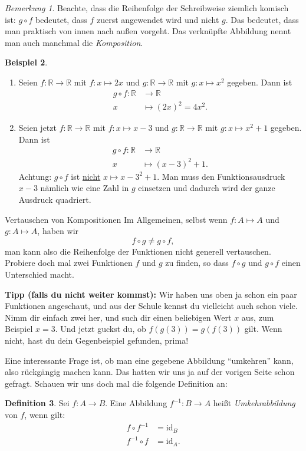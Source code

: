 \documentclass[a4paper,ngerman,12pt]{zirkelblatt1415}
\theoremstyle{definition}
\newtheorem{definition}{Definition}
\newtheorem{beispiel}[definition]{Beispiel}
\theoremstyle{remark}
\newtheorem{bem}[definition]{Bemerkung}
\newcommand{\RR}{\mathbb{R}}
\newcommand{\lra}{\longrightarrow}
\begin{document}
\begin{bem}
  Beachte, dass die Reihenfolge der Schreibweise ziemlich komisch ist: $g\circ f$ bedeutet, dass $f$ zuerst angewendet wird und nicht $g$. 
  Das bedeutet, dass man praktisch von innen nach außen vorgeht. 
  Das verknüpfte Abbildung nennt man auch manchmal die \emph{Komposition}.
\end{bem}

\begin{beispiel}
  \begin{enumerate}
    \item 
    Seien $f:\RR\longrightarrow\RR$ mit $f:x\mapsto 2x$ und $g:\RR\longrightarrow\RR$ mit $g:x \mapsto x^2$ gegeben. Dann ist
      \begin{align*}
        g\circ f:\RR & \longrightarrow \RR \\ 
        x & \longmapsto (2x)^2 = 4x^2.
      \end{align*}
    \item Seien jetzt $f:\RR\lra\RR$ mit $f:x \mapsto x-3$ und $g:\RR\lra\RR$ mit $g:x \mapsto x^2 +1$ gegeben. Dann ist 
      \begin{align*}
        g\circ f:\RR & \lra \RR \\
        x & \longmapsto (x-3)^2 +1.
      \end{align*}
      Achtung: $g \circ f$ ist \underline{nicht} $x \mapsto x-3^2 +1$.
      Man muss den Funktionsausdruck $x-3$ nämlich wie eine Zahl in $g$ 
      einsetzen und dadurch wird der ganze Ausdruck quadriert.
 \end{enumerate}
\end{beispiel}

\begin{aufgabe}{Vertauschen von Kompositionen}
Im Allgemeinen, selbst wenn $f:A\mapsto A$ und $g:A\mapsto A$, haben wir
\[
f\circ g \neq g \circ f,
\]
man kann also die Reihenfolge der Funktionen nicht generell vertauschen. 
Probiere doch mal zwei Funktionen $f$ und $g$ zu finden, so dass $f\circ g$ und $g\circ f$ einen Unterschied macht.

\textbf{Tipp (falls du nicht weiter kommst):} Wir haben uns oben ja schon ein paar Funktionen angeschaut, und aus der Schule kennst du vielleicht auch schon viele.
Nimm dir einfach zwei her, und such dir einen beliebigen Wert $x$ aus, zum Beispiel $x=3$.
Und jetzt guckst du, ob $f(g(3)) = g(f(3))$ gilt. Wenn nicht, hast du dein Gegenbeispiel gefunden, prima!
\end{aufgabe}

Eine interessante Frage ist, ob man eine gegebene Abbildung ``umkehren'' kann, also rückgängig machen kann.
Das hatten wir uns ja auf der vorigen Seite schon gefragt. 
Schauen wir uns doch mal die folgende Definition an:
\begin{definition}
Sei $f:A\longrightarrow B$. Eine Abbildung $f^{-1}:B\longrightarrow A$ heißt \emph{Umkehrabbildung} von $f$, wenn gilt:
\begin{align*}
f\circ f^{-1}& = \text{id}_B\\
f^{-1}\circ f& = \text{id}_A.
\end{align*}
\end{definition}
\end{document}
